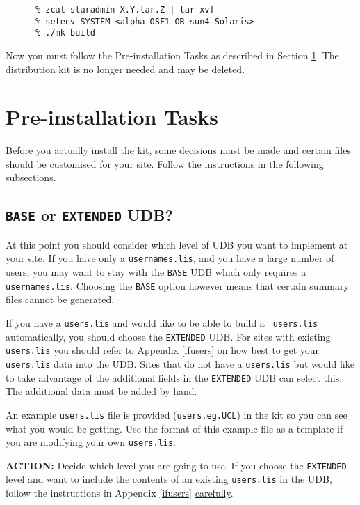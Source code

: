 \begin{verbatim}
      % zcat staradmin-X.Y.tar.Z | tar xvf -
      % setenv SYSTEM <alpha_OSF1 OR sun4_Solaris>
      % ./mk build
\end{verbatim}

Now you must follow the Pre-installation Tasks as described in Section
\ref{preinstall}.  The distribution kit is no longer needed and may be
deleted.

\section{Pre-installation Tasks}
\label{preinstall}

Before you actually install the kit, some decisions must be made and
certain files should be customised for your site.
Follow the instructions in the following subsections.

\subsection{{\tt BASE} or {\tt EXTENDED} UDB?}

At this point you should consider which level of UDB you want to implement
at your site. If you have only a {\tt usernames.lis}, and you have a large
number of users, you may want to stay with the {\tt BASE} UDB which only
requires a {\tt usernames.lis}. Choosing the {\tt BASE} option however
means that certain summary files cannot be generated.

If you have a {\tt users.lis} and would like to be able to build a {\tt
users.lis} automatically, you should choose the {\tt EXTENDED} UDB. For
sites with existing {\tt users.lis} you should refer to Appendix
\ref{ifusers} on how best to get your {\tt users.lis} data into the UDB.
Sites that do not have a {\tt users.lis} but would like to take advantage
of the additional fields in the {\tt EXTENDED} UDB can select this. The
additional data must be added by hand.

An example {\tt users.lis} file is provided ({\tt users.eg.UCL}) in the
kit so you can see what you would be getting. Use the format of this
example file as a template if you are modifying your own {\tt users.lis}.

{\large\bf ACTION:} Decide which level you are going to use. If you choose
the {\tt EXTENDED} level and want to include the contents of an existing
{\tt users.lis} in the UDB, follow the instructions in Appendix
\ref{ifusers} \underline{carefully}.

